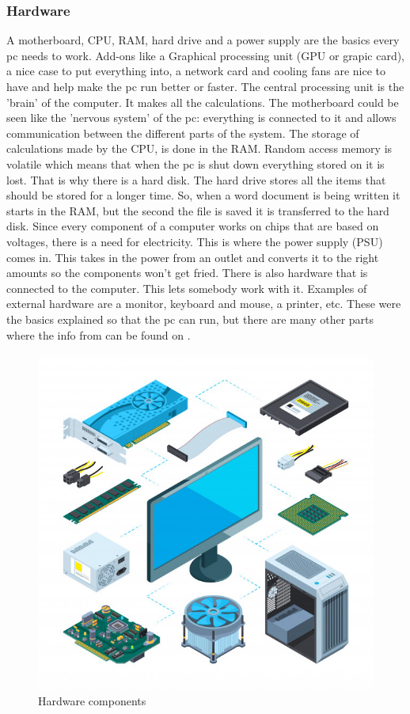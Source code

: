 \subsubsection{Hardware} \label{hardware}
A motherboard, CPU, RAM, hard drive and a power supply are the basics every pc needs to work.
Add-ons like a Graphical processing unit (GPU or grapic card), a nice case to put everything into, a network card and cooling fans are nice to have and help make the pc run better or faster.
The central processing unit is the 'brain' of the computer. It makes all the calculations.
The motherboard could be seen like the 'nervous system' of the pc: everything is connected to it and allows communication between the different parts of the system.
The storage of calculations made by the CPU, is done in the RAM. Random access memory is volatile which means that when the pc is shut down everything stored on it is lost.
That is why there is a hard disk. The hard drive stores all the items that should be stored for a longer time. So, when a word document is being written it starts in the RAM, but the second the file is saved it is transferred to the hard disk.
Since every component of a computer works on chips that are based on voltages, there is a need for electricity. This is where the power supply (PSU) comes in. This takes in the power from an outlet and converts it to the right amounts so the components won't get fried.
There is also hardware that is connected to the computer. This lets somebody work with it. Examples of external hardware are a monitor, keyboard and mouse, a printer, etc.
These were the basics explained so that the pc can run, but there are many other parts where the info from can be found on \cite[https://edu.Fcfglobal.org/en/computerbasics/]{ComputerBasics}.

\begin{figure} [h]
    \centering
    \includegraphics[width=\textwidth]{img/hardware.jpg}
        \caption{Hardware components \autocite{imghardware}}
        \label{fig:hardware}
\end{figure}

